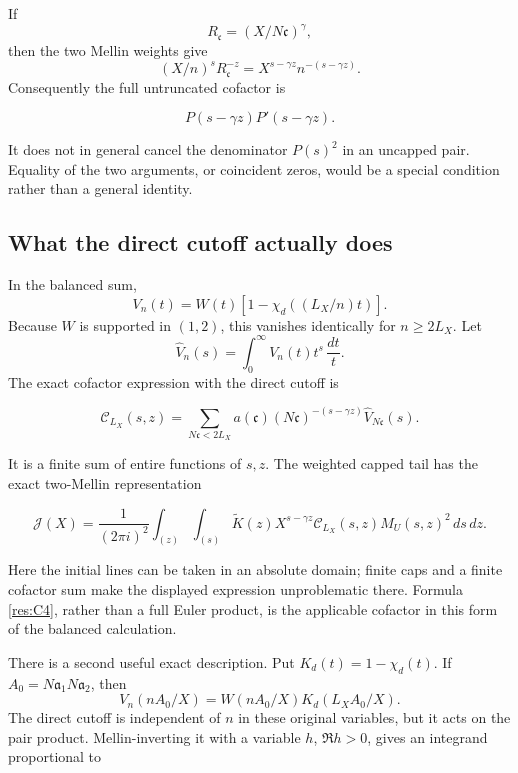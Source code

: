 \documentclass[11pt]{article}
\newcommand{\mathscr}{\mathcal}
\numberwithin{equation}{section}
\begin{document}
If \[
 R_{\mathfrak c}=(X/N\mathfrak c)^\gamma,
\] then the two Mellin weights give \[
 (X/n)^sR_{\mathfrak c}^{-z}
 =X^{s-\gamma z}n^{-(s-\gamma z)}.
\] Consequently the full untruncated cofactor is

\begin{equation}\label{res:C3}
P(s-\gamma z)P'(s-\gamma z).
\end{equation}

It does not in general cancel the denominator \(P(s)^2\) in an uncapped
pair. Equality of the two arguments, or coincident zeros, would be a
special condition rather than a general identity.

\subsection{What the direct cutoff actually
does}\label{what-the-direct-cutoff-actually-does}

In the balanced sum, \[
 V_n(t)=W(t)\left[1-\chi_d((L_X/n)t)\right].
\] Because \(W\) is supported in \((1,2)\), this vanishes identically
for \(n\geq2L_X\). Let \[
 \widehat V_n(s)=\int_0^\infty V_n(t)t^s\,\frac{dt}{t}.
\] The exact cofactor expression with the direct cutoff is

\begin{equation}\label{res:C4}
\mathcal C_{L_X}(s,z)
 =\sum_{N\mathfrak c<2L_X}
 a(\mathfrak c)(N\mathfrak c)^{-(s-\gamma z)}
 \widehat V_{N\mathfrak c}(s).
\end{equation}

It is a finite sum of entire functions of \(s,z\). The weighted capped
tail has the exact two-Mellin representation

\begin{equation}\label{res:C5}
\mathscr J(X)=\frac1{(2\pi i)^2}
 \int_{(z)}\int_{(s)}
 \widetilde K(z)X^{s-\gamma z}
 \mathcal C_{L_X}(s,z)M_U(s,z)^2\,ds\,dz.
\end{equation}

Here the initial lines can be taken in an absolute domain; finite caps
and a finite cofactor sum make the displayed expression unproblematic
there. Formula \eqref{res:C4}, rather than a full Euler product, is the
applicable cofactor in this form of the balanced calculation.

There is a second useful exact description. Put \(K_d(t)=1-\chi_d(t)\).
If \(A_0=N\mathfrak a_1N\mathfrak a_2\), then \[
 V_n(nA_0/X)=W(nA_0/X)K_d(L_XA_0/X).
\] The direct cutoff is independent of \(n\) in these original
variables, but it acts on the pair product. Mellin-inverting it with a
variable \(h\), \(\Re h>0\), gives an integrand proportional to
\end{document}
